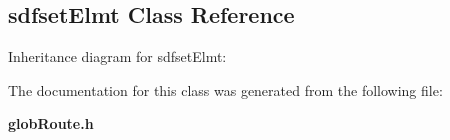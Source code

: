 \subsection{sdfset\-Elmt  Class Reference}
\label{sdfsetElmt}
Inheritance diagram for sdfset\-Elmt:\begin{figure}[H]
\begin{center}
\leavevmode
\setlength{\epsfysize}{2cm}
\end{center}
\end{figure}


The documentation for this class was generated from the following file:\begin{CompactItemize}
\item 
{\bf glob\-Route.h}\end{CompactItemize}
